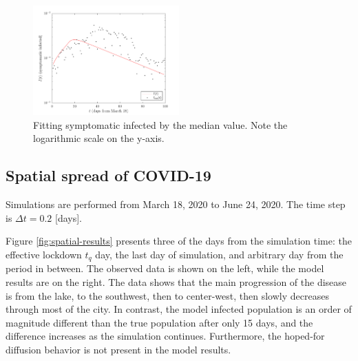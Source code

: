 \documentclass[11pt]{article}
\begin{document}
		\begin{figure}[h!]
			\centering
			\includegraphics[width=0.5\textwidth]{cases.pdf}
			\caption{Fitting symptomatic infected by the median value.
				Note the logarithmic scale on the y-axis.}
			\label{fig:fit}
		\end{figure}
	
	\subsection{Spatial spread of COVID-19} \label{sec:spread}
		Simulations are performed from March 18, 2020 to June 24, 2020.
		The time step is $\Delta t = 0.2$ [days].
		
		Figure \ref{fig:spatial-results} presents three of the days from the simulation time: the effective lockdown $t_q$ day, the last day of simulation, and arbitrary day from the period in between.
		The observed data is shown on the left, while the model results are on the right.
		The data shows that the main progression of the disease is from the lake, to the southwest, then to center-west, then slowly decreases through most of the city.
		In contrast, the model infected population is an order of magnitude different than the true population after only 15 days, and the difference increases as the simulation continues.
		Furthermore, the hoped-for diffusion behavior is not present in the model results.
		
\end{document}
